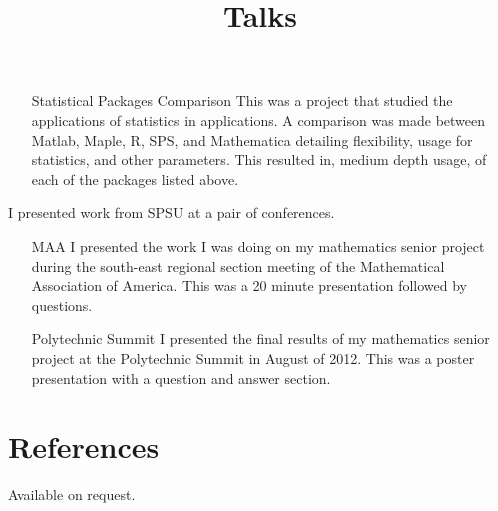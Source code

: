 \documentclass[margintitle,line]{res}
\begin{document}
\begin{resume}
\begin{position}
\begin{itemize}
\item[Statistical Packages Comparison] This was a project that studied the applications of statistics in applications. A comparison was made between Matlab, Maple, R, SPS, and Mathematica detailing flexibility, usage for statistics, and other parameters. This resulted in, medium depth usage, of each of the packages listed above.
\end{itemize}
\end{position}

\title{Talks}
\begin{position}
I presented work from SPSU at a pair of conferences.
\begin{itemize}
\item[MAA] I presented the work I was doing on my mathematics senior project during the south-east regional section meeting of the Mathematical Association of America. This was a 20 minute presentation followed by questions.
\item[Polytechnic Summit] I presented the final results of my mathematics senior project at the Polytechnic Summit in August of 2012. This was a poster presentation with a question and answer section.
\end{itemize}
\end{position}

\section{References}

Available on request.

\end{resume}
\end{document}
